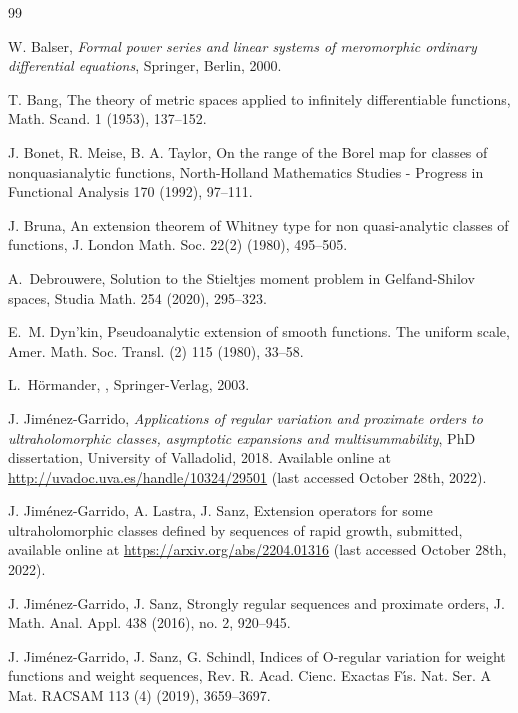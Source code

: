 \documentclass[11pt,a4paper]{article}
\theoremstyle{plain}
\theoremstyle{definition}
\begin{document}
\begin{thebibliography}{99}

\setlength{\itemsep}{0pt}
 W. Balser, \textit{Formal power series and linear systems of meromorphic ordinary differential equations}, Springer, Berlin, 2000.

 T. Bang, The theory of metric spaces applied to infinitely differentiable functions, Math. Scand. 1 (1953), 137--152.

 J. Bonet, R. Meise, B. A. Taylor, On the range of the Borel map for classes of nonquasianalytic functions, North-Holland Mathematics Studies - Progress in Functional Analysis 170 (1992), 97--111.

 J. Bruna, An extension theorem of Whitney type for non quasi-analytic classes of functions, J. London Math. Soc. 22(2) (1980), 495--505.

A.~Debrouwere, Solution to the {S}tieltjes moment problem in {G}elfand-{S}hilov spaces, Studia Math. 254 (2020), 295--323.

E.~M. Dyn'kin, Pseudoanalytic extension of smooth functions. {T}he uniform scale,
Amer. Math. Soc. Transl. (2) 115 (1980), 33--58.

L.~H\"ormander,
,
\newblock Springer-Verlag, 2003.

 J. Jim\'enez-Garrido, \emph{Applications of regular variation and proximate orders to ultraholomorphic classes, asymptotic expansions and multisummability}, PhD dissertation, University of Valladolid, 2018. Available online at \href{http://uvadoc.uva.es/handle/10324/29501}{http://uvadoc.uva.es/handle/10324/29501} (last accessed October 28th, 2022).

 J. Jim\'enez-Garrido, A. Lastra, J. Sanz, Extension operators for some ultraholomorphic classes defined by sequences of rapid growth, submitted, available online at \href{https://arxiv.org/abs/2204.01316}{https://arxiv.org/abs/2204.01316} (last accessed October 28th, 2022).

 J. Jim\'enez-Garrido, J. Sanz, Strongly regular sequences and
proximate orders, J. Math. Anal. Appl. 438 (2016), no. 2, 920--945.

 J. Jim\'enez-Garrido, J. Sanz, G. Schindl, Indices of O-regular variation for weight functions and weight sequences, Rev. R. Acad. Cienc. Exactas F{\'\i}s. Nat. Ser. A Mat. RACSAM 113 (4) (2019), 3659--3697.


\end{thebibliography}
\end{document}
